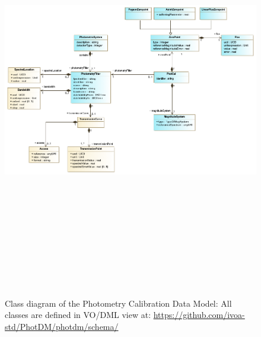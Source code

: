 \documentclass[11pt,a4paper]{ivoa}
\begin{document}
\begin{figure}[H]
\includegraphics[angle=90,width=5.98in,height=7.19in]{./schema/PhotometryOverviewDiagram_jan22.png}
\caption{Class diagram of the Photometry Calibration Data Model: All classes are defined in VO/DML view at: \url{https://github.com/ivoa-std/PhotDM/photdm/schema/}}
\end{figure}


\end{document}

